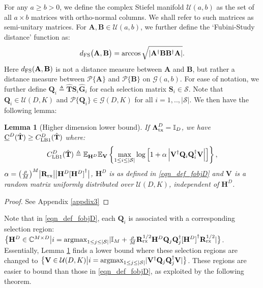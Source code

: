 \documentclass[journal,comsoc]{IEEEtran}
\newtheorem{lemma}{Lemma}[section]
\begin{document}
For any $a \geq b > 0$, we define the complex Stiefel manifold $\mathcal{U}(a,b)$ as the set of all $a \times b$ matrices with ortho-normal columns. We shall refer to such matrices as semi-unitary matrices. For $\mathbf{A}, \mathbf{B} \in \mathcal{U}(a,b)$, we further define the `Fubini-Study distance' function as: 
\begin{eqnarray}
d_{\rm FS} \big(\mathbf{A}, \mathbf{B} \big) = \arccos \sqrt{|\mathbf{A}^{\dag} \mathbf{B} \mathbf{B}^{\dag} \mathbf{A}|}. \label{eqn_define_FS}
\end{eqnarray} 
Here $d_{\rm FS} (\mathbf{A}, \mathbf{B})$ is not a distance measure between $\mathbf{A}$ and $\mathbf{B}$, but rather a distance measure between $\mathcal{P}\{\mathbf{A}\}$ and $\mathcal{P}\{\mathbf{B}\}$ on $\mathcal{G}(a,b)$. 
For ease of notation, we further define $\mathbf{Q}_i \triangleq \hat{\mathbf{T}}\mathbf{S}_i \hat{\mathbf{G}}_i$ for each selection matrix $\mathbf{S}_i \in \mathcal{S}$. Note that $\mathbf{Q}_i \in\mathcal{U}(D,K)$ and $\mathcal{P}\{\mathbf{Q}_i\} \in \mathcal{G}(D,K)$ for all $i=1,..,|\mathcal{S}|$. 
We then have the following lemma:
\begin{lemma}[Higher dimension lower bound] \label{Th_subopt_selection}
If $\boldsymbol{\Lambda}^D_{\rm tx} = \mathbb{I}_D$, we have $\underbar{C}^{D}(\hat{\mathbf{T}}) \geq C^{D}_{\rm LB1}(\hat{\mathbf{T}})$ where: 
\begin{eqnarray}
C^{D}_{\rm LB1}(\hat{\mathbf{T}}) \triangleq \mathbb{E}_{\mathbf{H}^D} \mathbb{E}_{\mathbf{V}} \left\{ \max_{1 \leq i \leq |\mathcal{S}|} \log \left[ 1 + \alpha\left| \mathbf{V}^{\dag} \mathbf{Q}_i \mathbf{Q}^{\dag}_i \mathbf{V} \right| \right] \right\}, \label{eqn_th3_LB2}
\end{eqnarray}
$\alpha = {\left(\frac{\rho}{M} \right)}^M \big|\mathbf{R}_{\rm rx} \big| \big| \mathbf{H}^D {[\mathbf{H}^D]}^{\dag} \big|$, $\mathbf{H}^D$ is as defined in \eqref{eqn_def_fobjD} and $\mathbf{V}$ is a random matrix uniformly distributed over $\mathcal{U}(D,K)$, independent of $\mathbf{H}^D$.
\end{lemma}
%
\begin{proof}
See Appendix \ref{appdix3}
\end{proof}
%
%
%
Note that in \eqref{eqn_def_fobjD}, each $\mathbf{Q}_i$ is associated with a corresponding selection region: $\big\{ \mathbf{H}^D \in \mathbb{C}^{M\times D} \big| i  = {\rm argmax}_{1\leq j \leq |\mathcal{S}|} | \mathbb{I}_M + \frac{\rho}{M} \mathbf{R}_{\rm rx}^{1/2} \mathbf{H}^D \mathbf{Q}_j \mathbf{Q}^{\dag}_j {[\mathbf{H}^D]}^{\dag} \mathbf{R}_{\rm rx}^{1/2} | \big\}$. Essentially, Lemma \ref{Th_subopt_selection} finds a lower bound where these selection regions are changed to $\big\{ \mathbf{V} \in \mathcal{U}(D,K) \big| i  = {\rm argmax}_{1\leq j \leq |\mathcal{S}|} | \mathbf{V}^{\dag} \mathbf{Q}_j \mathbf{Q}^{\dag}_j \mathbf{V}| \big\}$. These regions are easier to bound than those in \eqref{eqn_def_fobjD}, as exploited by the following theorem. 
\end{document}
